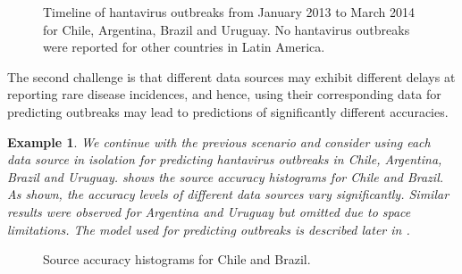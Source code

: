 \documentclass[conference]{IEEEtran}
\newtheorem{example}{Example}
\begin{document}
\begin{figure}[t]
\begin{center}
\end{center}
\caption{Timeline of hantavirus outbreaks from January 2013 to March 2014 for Chile, Argentina, Brazil and Uruguay. No hantavirus outbreaks were reported for other countries in Latin America.}
\label{fig:hanta_timelines}
\end{figure}

The second challenge is that different data sources may exhibit different delays at reporting rare disease incidences, and hence, using their corresponding data for predicting outbreaks may lead to predictions of significantly different accuracies. 

\begin{example}
{\em We continue with the previous scenario and consider using each data source in isolation for predicting hantavirus outbreaks in Chile, Argentina, Brazil and Uruguay.  shows the source accuracy histograms for Chile and Brazil. As shown, the accuracy levels of different data sources vary significantly. Similar results were observed for Argentina and Uruguay but omitted due to space limitations. The model used for predicting outbreaks is described later in .}
\end{example}

\begin{figure}[ht]
\begin{center}
\end{center}
\caption{Source accuracy histograms for Chile and Brazil.}
\label{fig:src_char}
\end{figure}
\end{document}
